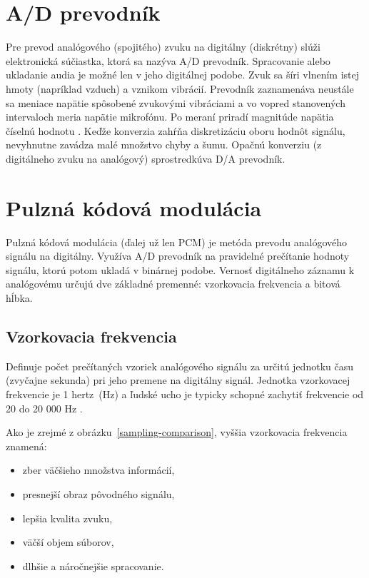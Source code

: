 \section{A/D prevodník}
\label{ad_prevodnik}

Pre prevod analógového (spojitého) zvuku na digitálny (diskrétny) slúži elektronická súčiastka, ktorá sa nazýva A/D prevodník. Spracovanie alebo ukladanie audia je možné len v jeho digitálnej podobe. Zvuk sa šíri vlnením istej hmoty (napríklad vzduch) a vznikom vibrácií. Prevodník zaznamenáva neustále sa meniace napätie spôsobené zvukovými vibráciami a vo vopred stanovených intervaloch meria napätie mikrofónu. Po meraní priradí magnitúde napätia číselnú hodnotu \cite{Lathi}. Keďže konverzia zahŕňa diskretizáciu oboru hodnôt signálu, nevyhnutne zavádza malé množstvo chyby a šumu. Opačnú konverziu (z digitálneho zvuku na analógový) sprostredkúva D/A prevodník.



\section{Pulzná kódová modulácia}
\label{PCM}

Pulzná kódová modulácia (ďalej už len PCM) je metóda prevodu analógového signálu na digitálny. Využíva A/D prevodník na pravidelné prečítanie hodnoty signálu, ktorú potom ukladá v binárnej podobe. Vernosť digitálneho záznamu k analógovému určujú dve základné premenné: vzorkovacia frekvencia a bitová hĺbka. 

\subsection*{Vzorkovacia frekvencia}

Definuje počet prečítaných vzoriek analógového signálu za určitú jednotku času (zvyčajne sekunda) pri jeho premene na digitálny signál. Jednotka vzorkovacej frekvencie je 1 hertz~(Hz) a ľudské ucho je typicky schopné zachytiť frekvencie od 20 do 20 000 Hz  \cite{Physics4}.

Ako je zrejmé z obrázku~\ref{sampling-comparison}, vyššia vzorkovacia frekvencia znamená:
\begin{itemize}
  \item{zber väčšieho množstva informácií,}
  \item{presnejší obraz pôvodného signálu,}
  \item{lepšia kvalita zvuku,}
  \item{väčší objem súborov,}
  \item{dlhšie a náročnejšie spracovanie.}
\end{itemize}

